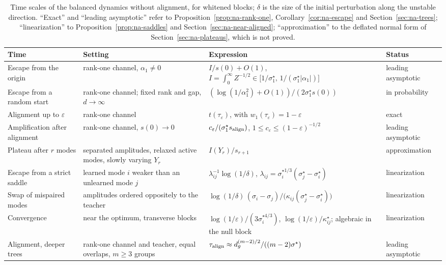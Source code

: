 \documentclass[11pt]{article}
\theoremstyle{definition}
\numberwithin{equation}{section}
\begin{document}
\begin{table}[tbp]
\centering
\footnotesize
\renewcommand{\arraystretch}{1.3}
\begin{tabular}{p{}p{}p{}p{}}
\hline
\raggedright Time & \raggedright Setting & \raggedright Expression & \raggedright Status \tabularnewline
\hline
\raggedright Escape from the origin & \raggedright rank-one channel, $\alpha_1\neq0$ & \raggedright $I/s(0)+O(1)$, $I=\int_0^\infty Z^{-1/2}\in\big[1/\sigma^\star_1,\,1/(\sigma^\star_1|\alpha_1|)\big]$ & \raggedright leading asymptotic \tabularnewline
\raggedright Escape from a random start & \raggedright rank-one channel; fixed rank and gap, $d\to\infty$ & \raggedright $(\log(1/\alpha_1^2)+O(1))/(2\sigma^\star_1s(0))$ & \raggedright in probability \tabularnewline
\raggedright Alignment up to $\varepsilon$ & \raggedright rank-one channel & \raggedright $t(\tau_\varepsilon)$, with $w_1(\tau_\varepsilon)=1-\varepsilon$ & \raggedright exact \tabularnewline
\raggedright Amplification after alignment & \raggedright rank-one channel, $s(0)\to0$ & \raggedright $c_\varepsilon/(\sigma^\star_1s_{\rm align})$, $1\le c_\varepsilon\le(1-\varepsilon)^{-1/2}$ & \raggedright leading asymptotic \tabularnewline
\raggedright Plateau after $r$ modes & \raggedright separated amplitudes, relaxed active modes, slowly varying $Y_r$ & \raggedright $I(Y_r)/s_{r+1}$ & \raggedright approximation \tabularnewline
\raggedright Escape from a strict saddle & \raggedright learned mode $i$ weaker than an unlearned mode $j$ & \raggedright $\lambda_{ij}^{-1}\log(1/\delta)$, $\lambda_{ij}=\sigma^{\star1/3}_i(\sigma^\star_j-\sigma^\star_i)$ & \raggedright linearization \tabularnewline
\raggedright Swap of mispaired modes & \raggedright amplitudes ordered oppositely to the teacher & \raggedright $\log(1/\delta)\,(\sigma_i-\sigma_j)/\big(\kappa_{ij}(\sigma^\star_j-\sigma^\star_i)\big)$ & \raggedright linearization \tabularnewline
\raggedright Convergence & \raggedright near the optimum, transverse blocks & \raggedright $\log(1/\varepsilon)/(3\sigma^{\star4/3}_i)$, $\log(1/\varepsilon)/\kappa^\star_{ij}$; algebraic in the null block & \raggedright linearization \tabularnewline
\raggedright Alignment, deeper trees & \raggedright rank-one channel and teacher, equal overlaps, $m\ge3$ groups & \raggedright $\tau_{\rm align}\approx d_g^{(m-2)/2}/((m-2)\sigma^\star)$ & \raggedright leading asymptotic \tabularnewline
\hline
\end{tabular}
\caption{Time scales of the balanced dynamics without alignment, for whitened blocks; $\delta$ is the size of the initial perturbation along the unstable direction. ``Exact'' and ``leading asymptotic'' refer to Proposition~\ref{prop:na-rank-one}, Corollary~\ref{cor:na-escape} and Section~\ref{sec:na-trees}; ``linearization'' to Proposition~\ref{prop:na-saddles} and Section~\ref{sec:na-near-aligned}; ``approximation'' to the deflated normal form of Section~\ref{sec:na-plateaus}, which is not proved.}
\label{tab:na-times}
\end{table}
\end{document}
